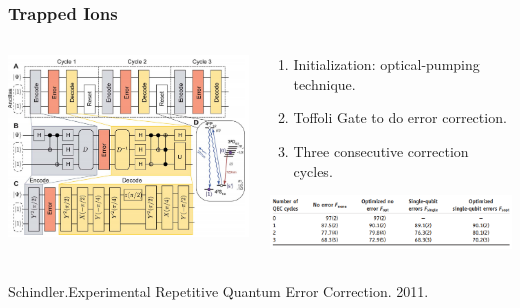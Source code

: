 \documentclass[aspectratio=169,10pt]{beamer}
\begin{document}
\begin{frame}
    \frametitle{Trapped Ions}
    \begin{columns}
        \begin{column}{0.55\textwidth}
            \centering
            \includegraphics[width=\columnwidth]{figure/qec2.png}
        \end{column}
        \begin{column}{0.45\textwidth}
            \begin{enumerate}
                \item Initialization: optical-pumping technique.
                \item Toffoli Gate to do error correction.
                \item Three consecutive correction cycles.
            \end{enumerate}
            \includegraphics[width=\columnwidth]{figure/qec21.png}
        \end{column}
    \end{columns}
\tiny{Schindler.Experimental Repetitive Quantum Error Correction. 2011.}
\end{frame}
\end{document}
